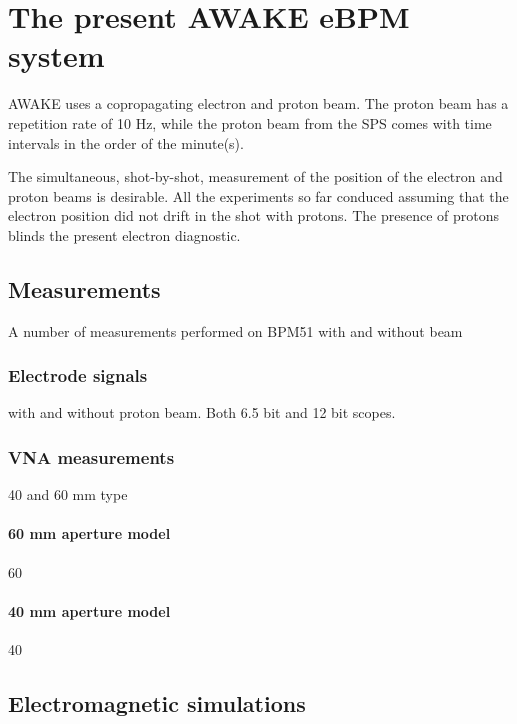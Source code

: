 \chapter[The present AWAKE eBPM system]{The present AWAKE eBPM system}

AWAKE uses a copropagating electron and proton beam. The proton beam has a repetition rate of 10 Hz, while the proton beam from the SPS comes with time intervals in the order of the minute(s).

The simultaneous, shot-by-shot, measurement of the position of the electron and proton beams is desirable. All the experiments so far conduced assuming that the electron position did not drift in the shot with protons. The presence of protons blinds the present electron diagnostic.



\section[Measurements]{Measurements}

A number of measurements performed on BPM51 with and without beam

\subsection[Electrode signals]{Electrode signals}

with and without proton beam. Both 6.5 bit and 12 bit scopes.

\subsection[VNA measurements]{VNA measurements}

40 and 60 mm type

\subsubsection[60 mm aperture model]{60 mm aperture model}

60

\subsubsection[40 mm aperture model]{40 mm aperture model}

40



\section[Electromagnetic simulations]{Electromagnetic simulations}

